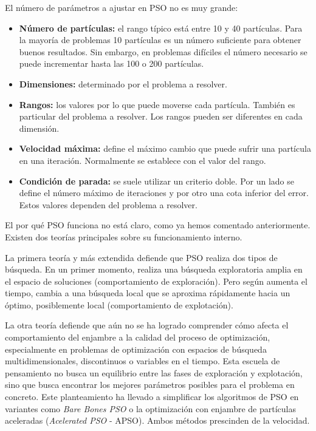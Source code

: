 \documentclass[a4paper,12pt,titlepage]{article}
\begin{document}
El número de parámetros a ajustar en PSO no es muy grande: \citep{xiaohui_hu_particle}

\begin{itemize}[noitemsep]
	\item \textbf{Número de partículas:} el rango típico está entre 10 y 40 partículas. Para la mayoría de problemas 10 partículas es un número suficiente para obtener buenos resultados. Sin embargo, en problemas difíciles el número necesario se puede incrementar hasta las 100 o 200 partículas.
	\item \textbf{Dimensiones:} determinado por el problema a resolver.
	\item \textbf{Rangos:} los valores por lo que puede moverse cada partícula. También es particular del problema a resolver. Los rangos pueden ser diferentes en cada dimensión.
	\item \textbf{Velocidad máxima:} define el máximo cambio que puede sufrir una partícula en una iteración. Normalmente se establece con el valor del rango.
	\item \textbf{Condición de parada:} se suele utilizar un criterio doble. Por un lado se define el número máximo de iteraciones y por otro una cota inferior del error. Estos valores dependen del problema a resolver.
\end{itemize}

El por qué PSO funciona no está claro, como ya hemos comentado anteriormente. Existen dos teorías principales sobre su funcionamiento interno. \citep{_particle_2016}

La primera teoría y más extendida defiende que PSO realiza dos tipos de búsqueda. En un primer momento, realiza una búsqueda exploratoria amplia en el espacio de soluciones (comportamiento de exploración). Pero según aumenta el tiempo, cambia a una búsqueda local que se aproxima rápidamente hacia un óptimo, posiblemente local (comportamiento de explotación).

La otra teoría defiende que aún no se ha logrado comprender cómo afecta el comportamiento del enjambre a la calidad del proceso de optimización, especialmente en problemas de optimización con espacios de búsqueda multidimensionales, discontinuos o variables en el tiempo. Esta escuela de pensamiento no busca un equilibrio entre las fases de exploración y explotación, sino que busca encontrar los mejores parámetros posibles para el problema en concreto. Este planteamiento ha llevado a simplificar los algoritmos de PSO en variantes como \textit{Bare Bones PSO} \citep{Kennedy2003} o la optimización con enjambre de partículas aceleradas (\textit{Acelerated PSO} - APSO). Ambos métodos prescinden de la velocidad.
\end{document}
